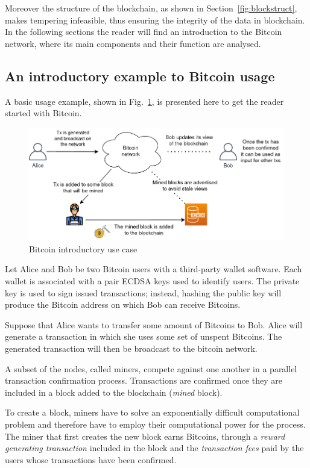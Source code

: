 \documentclass[12pt, letterpaper, twoside]{article}
\begin{document}
Moreover the structure of the blockchain, as shown in Section~\ref{fig:blockstruct}, makes tempering infeasible, thus ensuring the integrity of the data in blockchain.\\

In the following sections the reader will find an introduction to the Bitcoin network, where its main components and their function are analysed.


\subsection{An introductory example to Bitcoin usage}\label{sec:useexample}
A basic usage example, shown in Fig.~\ref{fig:basicexample}, is presented here to get the reader started with Bitcoin.

\begin{figure}[h!]
	\includegraphics[width=.90\textwidth]{pict/basicexample.png}
	\centering
	\caption{Bitcoin introductory use case}
	\label{fig:basicexample}
\end{figure}

Let Alice and Bob be two Bitcoin users with a third-party wallet software. Each wallet is associated with a pair ECDSA keys used to identify users. The private key is used to sign issued transactions; instead, hashing the public key will produce the Bitcoin address on which Bob can receive Bitcoins.

Suppose that Alice wants to transfer some amount of Bitcoins to Bob. Alice will generate a transaction in which she uses some set of unspent Bitcoins. The generated transaction will then be broadcast to the bitcoin network.

A subset of the nodes, called miners, compete against one another in a parallel transaction confirmation process. Transactions are confirmed once they are included in a block added to the blockchain (\emph{mined} block).

To create a block, miners have to solve an exponentially difficult computational problem and therefore have to employ their computational power for the process. The miner that first creates the new block earns Bitcoins, through a \emph{reward generating transaction} included in the block and the \emph{transaction fees} paid by the users whose transactions have been confirmed.
\end{document}

